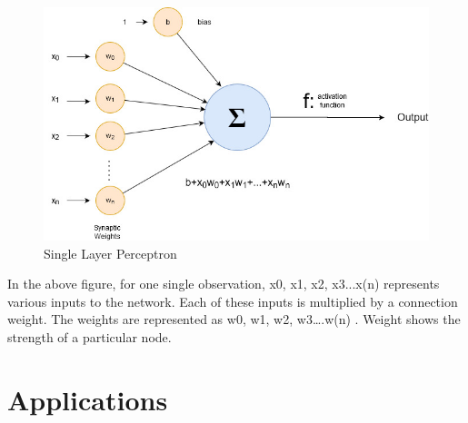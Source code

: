 \documentclass[a4paper, 12pt]{article}
\begin{document}
\begin{itemize}
\begin{figure}[H]
	\begin{center}
		\includegraphics[scale=.6]{images/perceptron}
		\caption{Single Layer Perceptron }
		\label{fig:perceptron}
	\end{center}
\end{figure}
In the above figure, for one single observation, x0, x1, x2, x3...x(n) represents various inputs to the network. Each of these inputs is multiplied by a connection weight. The weights are represented as w0, w1, w2, w3….w(n) . Weight shows the strength of a particular node.
\end{itemize}

\section*{Applications}
\end{document}
